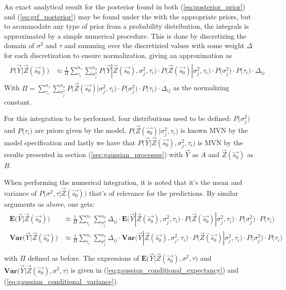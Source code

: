 An exact analytical result for the posterior found in both (\ref{eq:posterior_prior}) and (\ref{eq:grf_posterior}) may be found under the with the appropriate priors, but to acommodate any type of prior from a probability distribution, the integrals is approximated by a simple numerical procedure. This is done by discretizing the domain of $\sigma^2$ and $\tau$ and summing over the discretizied values with some weight $\Delta$ for each discretization to ensure normalization, giving an approximation as
\begin{align*}
\begin{split}
P \big( \vec{Y} | \vec{Z}(\vec{s_0}) \big) &\approx \frac{1}{\Pi}\sum_{\tau_i}^{n_{\tau}} \sum_{\sigma^2_j}^{n_{\sigma}} P \big( \vec{Y} | \vec{Z}(\vec{s_0}), \sigma^2_j, \tau_i \big) \cdot P\big( \vec{Z}(\vec{s_0}) | \sigma^2_j, \tau_i \big) \cdot P\big( \sigma^2_j \big) \cdot P\big( \tau_i \big) \cdot \Delta_{ij}
\end{split}
\end{align*}
With $\Pi = \sum_{\tau_i}^{n_{\tau}} \sum_{\sigma^2_j}^{n_{\sigma}} P\big( \vec{Z}(\vec{s_0}) | \sigma^2_j, \tau_i \big) \cdot P\big( \sigma^2_j \big) \cdot P\big( \tau_i \big) \cdot \Delta_{ij}$ as the normalizing constant.

For this integration to be performed, four distributions need to be defined: $P\big( \sigma^2_j \big)$ and $P\big( \tau_i \big)$ are priors given by the model, $P\big( \vec{Z}(\vec{s_0}) | \sigma^2_j, \tau_i \big)$ is known MVN by the model specification and lastly we have that $P \big( \vec{Y} | \vec{Z}(\vec{s_0}), \sigma^2_j, \tau_i \big)$ is MVN by the results presented in section (\ref{sec:gaussian_processes}) with $\vec{Y}$ as $A$ and $\vec{Z}(\vec{s_0})$ as $B$.

When performing the numerical integration, it is noted that it's the mean and variance of $P\big( \sigma^2, \tau | \vec{Z}(\vec{s_0}) \big)$ that's of relevance for the predictions. By similar arguments as above, one gets:
\begin{align}\label{eq:expected_variance_grf_posterior}
\begin{split}
\mathbf{E} \big( \vec{Y} | \vec{Z}(\vec{s_0}) \big) & \approx \frac{1}{\Pi}\sum_{\tau_i}^{n_{\tau}} \sum_{\sigma^2_j}^{n_{\sigma}} \Delta_{ij} \cdot \mathbf{E} \big( \vec{Y} | \vec{Z}(\vec{s_0}), \sigma^2_j, \tau_i \big) \cdot P\big( \vec{Z}(\vec{s_0}) | \sigma^2_j, \tau_i \big) \cdot P\big( \sigma^2_j \big) \cdot P\big( \tau_i \big) \\
\mathbf{Var} \big( \vec{Y} | \vec{Z}(\vec{s_0}) \big) & \approx \frac{1}{\Pi}\sum_{\tau_i}^{n_{\tau}} \sum_{\sigma_j^2}^{n_{\sigma}} \Delta_{ij} \cdot \mathbf{Var} \big( \vec{Y} | \vec{Z}(\vec{s_0}), \sigma^2_j, \tau_i \big) \cdot P\big( \vec{Z}(\vec{s_0}) | \sigma^2_j, \tau_i \big) \cdot P\big( \sigma^2_j \big) \cdot P\big( \tau_i \big) \\\end{split}
\end{align}
with $\Pi$ defined as before. The expressions of $\mathbf{E} \big( \vec{Y} | \vec{Z}(\vec{s_0}), \sigma^2, \tau \big)$ and $\mathbf{Var} \big( \vec{Y} | \vec{Z}(\vec{s_0}), \sigma^2, \tau \big)$ is given in (\ref{eq:gaussian_conditional_expectancy}) and (\ref{eq:gaussian_conditional_variance}).

